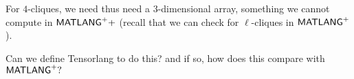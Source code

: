 For $4$-cliques, we need thus need a $3$-dimensional array, something we cannot compute in $\mathsf{MATLANG}^{\sf +}+$ (recall that we can check for $\ell$-cliques in $\mathsf{MATLANG}^{\sf +}$).

\begin{todo}
Can we define Tensorlang to do this? and if so, how does this compare with $\mathsf{MATLANG}^{\sf +}?$
\end{todo}
%
%
%
%
%
%
%
%
%
%
%
%



